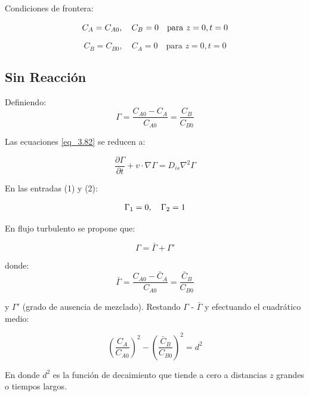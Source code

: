 Condiciones de frontera:

\begin{equation}
    C_A = C_{A0}, \quad C_B = 0 \quad \text{para } z=0, t=0
    \notag
\end{equation}

\begin{equation}
    C_B = C_{B0}, \quad C_A = 0 \quad \text{para } z=0, t=0
\end{equation}

\subsection{Sin Reacción}

Definiendo:
\begin{equation}
    \Gamma = \frac{C_{A0} - C_A}{C_{A0}} = \frac{C_B}{C_{B0}}
\end{equation}

Las ecuaciones \eqref{eq_3.82} se reducen a:

\begin{equation}
    \frac{\partial \Gamma}{\partial t} + v \cdot \nabla \Gamma = D_{is} \nabla^2 \Gamma
\end{equation}

En las entradas (1) y (2):

\begin{equation}
    \Gamma_1 = 0, \quad \Gamma_2 = 1 \notag
\end{equation}

En flujo turbulento se propone que:

\begin{equation}
    \Gamma = \bar{\Gamma} + \Gamma'
\end{equation}

donde:
\begin{equation}
   \bar{\Gamma} = \frac{C_{A0} - \bar{C}_A}{C_{A0}} = \frac{\bar{C}_B}{C_{B0}}
\end{equation}




y $\Gamma'$ (grado de ausencia de mezclado). Restando $\Gamma$ - $\bar{\Gamma}$  y efectuando el cuadrático medio:

\begin{equation}
    \left( \frac{C_A}{C_{A0}} \right)^2 - \left( \frac{\bar{C}_B}{C_{B0}} \right)^2 = d^2
\end{equation}

En donde $d^2$ es la función de decaimiento que tiende a cero a distancias $z$ grandes o tiempos largos.


